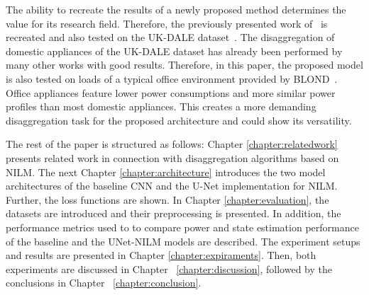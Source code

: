 \documentclass[sigconf]{acmart}
\begin{document}
The ability to recreate the results of a newly proposed method determines the value for its research field.
Therefore, the previously presented work of~\cite{unetnilm} is recreated and also tested on the UK-DALE dataset~\cite{UK-DALE}.
The disaggregation of domestic appliances of the UK-DALE dataset has already been performed by many other works with good results.
Therefore, in this paper, the proposed model is also tested on loads of a typical office environment provided by BLOND~\cite{BLOND}.
Office appliances feature lower power consumptions and more similar power profiles than most domestic appliances.
This creates a more demanding disaggregation task for the proposed architecture and could show its versatility.

The rest of the paper is structured as follows: 
Chapter \ref{chapter:relatedwork} presents related work in connection with disaggregation algorithms based on NILM. 
The next Chapter \ref{chapter:architecture} introduces the two model architectures of the baseline CNN and the U-Net implementation for NILM. 
Further, the loss functions are shown.
In Chapter \ref{chapter:evaluation}, the datasets are introduced and their preprocessing is presented.
In addition, the performance metrics used to to compare power and state estimation performance of the baseline and the UNet-NILM models are described.
The experiment setups and results are presented in Chapter \ref{chapter:expiraments}. 
Then, both experiments are discussed in Chapter ~\ref{chapter:discussion}, followed by the conclusions in Chapter ~\ref{chapter:conclusion}.
 
\end{document}
